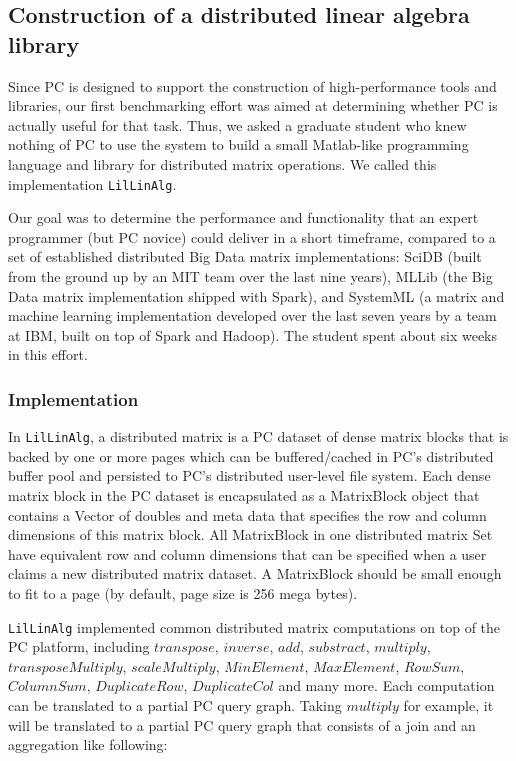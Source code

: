 \subsection {Construction of a distributed linear algebra library}
Since PC is designed to support the construction
of high-performance tools and libraries, our first benchmarking effort was aimed at determining 
whether PC is actually useful for that task.  Thus, we asked
a graduate student who knew nothing of PC to use the system to build a small Matlab-like 
programming language and library for distributed matrix operations.
We called this implementation \texttt{LilLinAlg}.

Our goal was to determine the 
performance and functionality that an expert programmer (but PC novice) could deliver in a short
timeframe, compared to a set of established distributed Big Data matrix implementations:
SciDB \cite{brown2010overview, stonebraker2011architecture} (built from the ground up by an MIT team over the last nine years), MLLib \cite{meng2016mllib} 
(the Big Data matrix
implementation shipped with Spark), and SystemML \cite{boehm2014hybrid, ghoting2011systemml, boehm2016systemml}
(a matrix and machine learning implementation developed
over the last seven years by a team at IBM, built on top of Spark and Hadoop).
The student spent about six weeks in this effort.

\subsubsection {Implementation}
In \texttt{LilLinAlg}, a distributed matrix is a PC dataset of dense matrix
blocks that is backed by one or more pages which can be buffered/cached in PC's distributed buffer pool and
persisted to PC's distributed user-level file system. Each dense matrix
block in the PC dataset is encapsulated as a MatrixBlock object that contains a
Vector of doubles and meta data that specifies the row and column
dimensions of this matrix block. All MatrixBlock in one distributed
matrix Set have equivalent row and column dimensions that can be
specified when a user claims a new distributed matrix dataset. A
MatrixBlock should be small enough to fit to a page (by default, page size
is 256 mega bytes).

\texttt{LilLinAlg} implemented common distributed matrix
computations on top of the PC platform, including $transpose$,
$inverse$, $add$, $substract$, $multiply$, $transposeMultiply$, $scaleMultiply$, $MinElement$,
$MaxElement$, $RowSum$, $ColumnSum$, $DuplicateRow$, $DuplicateCol$
and many more. Each computation can be translated to a partial PC query
graph. Taking $multiply$ for example, it will be translated to a partial
PC query graph that consists of a join and an aggregation like following:

